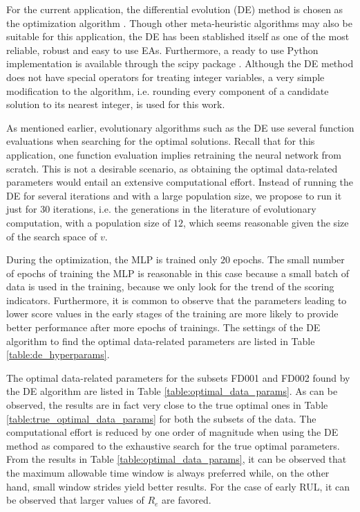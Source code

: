 \documentclass[12pt]{IEEEtran}%
\begin{document}
For the current application, the differential evolution (DE) method is chosen
as the optimization algorithm \cite{Storn1997}. Though other meta-heuristic
algorithms may also be suitable for this application, the DE has been
stablished itself as one of the most reliable, robust and easy to use EAs.
Furthermore, a ready to use Python implementation is available through the
scipy package \cite{scipy}. Although the DE method does not have special
operators for treating integer variables, a very simple modification to the
algorithm, i.e. rounding every component of a candidate solution to its
nearest integer, is used for this work.

As mentioned earlier, evolutionary algorithms such as the DE use several
function evaluations when searching for the optimal solutions. Recall that for
this application, one function evaluation implies retraining the neural
network from scratch. This is not a desirable scenario, as obtaining the
optimal data-related parameters would entail an extensive computational
effort. Instead of running the DE for several iterations and with a large
population size, we propose to run it just for $30$ iterations, i.e. the
generations in the literature of evolutionary computation, with a population
size of $12$, which seems reasonable given the size of the search space of $v$.

During the optimization, the MLP is trained only $20$ epochs. The small number
of epochs of training the MLP is reasonable in this case because a small batch
of data is used in the training, because we only look for the trend of the scoring indicators.
Furthermore, it is common to observe that the parameters leading to lower
score values in the early stages of the training are more likely to provide
better performance after more epochs of trainings. The settings of
the DE algorithm to find the optimal data-related parameters are listed in
Table \ref{table:de_hyperparams}.

The optimal data-related parameters for the subsets FD001 and FD002 found by
the DE algorithm are listed in Table \ref{table:optimal_data_params}. As can be
observed, the results are in fact very close to the true optimal ones 
in Table \ref{table:true_optimal_data_params} for both the subsets of the
data. The computational effort is reduced by one order of magnitude when using
the DE method as compared to the exhaustive search for the true optimal
parameters. From the results in Table \ref{table:optimal_data_params}, it can
be observed that the maximum allowable time window is always preferred while,
on the other hand, small window strides yield better results. For the case of
early RUL, it can be observed that larger values of $R_{e}$ are favored.
\end{document}
